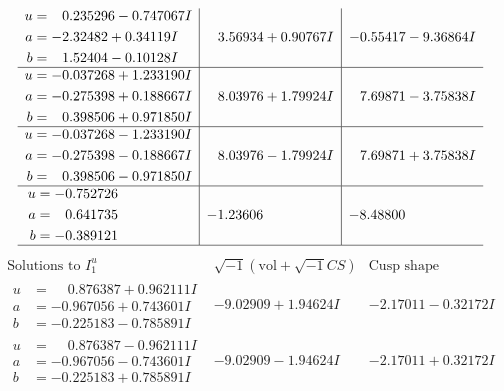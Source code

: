 \documentclass[1p]{elsarticle_modified}
\theoremstyle{definition}
\newcommand{\I}{\sqrt{-1}}
\begin{document}
$$\begin{array}{c|c|c}
\begin{aligned}
u &= \phantom{-}0.235296 - 0.747067 I \\
a &= -2.32482 + 0.34119 I \\
b &= \phantom{-}1.52404 - 0.10128 I\end{aligned}
 & \phantom{-}3.56934 + 0.90767 I & -0.55417 - 9.36864 I \\ \hline\begin{aligned}
u &= -0.037268 + 1.233190 I \\
a &= -0.275398 + 0.188667 I \\
b &= \phantom{-}0.398506 + 0.971850 I\end{aligned}
 & \phantom{-}8.03976 + 1.79924 I & \phantom{-}7.69871 - 3.75838 I \\ \hline\begin{aligned}
u &= -0.037268 - 1.233190 I \\
a &= -0.275398 - 0.188667 I \\
b &= \phantom{-}0.398506 - 0.971850 I\end{aligned}
 & \phantom{-}8.03976 - 1.79924 I & \phantom{-}7.69871 + 3.75838 I \\ \hline\begin{aligned}
u &= -0.752726\phantom{ +0.000000I} \\
a &= \phantom{-}0.641735\phantom{ +0.000000I} \\
b &= -0.389121\phantom{ +0.000000I}\end{aligned}
 & -1.23606\phantom{ +0.000000I} & -8.48800\phantom{ +0.000000I}\\
 \hline 
 \end{array}$$\newpage$$\begin{array}{c|c|c}  
\text{Solutions to }I^u_{1}& \I (\text{vol} + \sqrt{-1}CS) & \text{Cusp shape}\\
 \hline 
\begin{aligned}
u &= \phantom{-}0.876387 + 0.962111 I \\
a &= -0.967056 + 0.743601 I \\
b &= -0.225183 - 0.785891 I\end{aligned}
 & -9.02909 + 1.94624 I & -2.17011 - 0.32172 I \\ \hline\begin{aligned}
u &= \phantom{-}0.876387 - 0.962111 I \\
a &= -0.967056 - 0.743601 I \\
b &= -0.225183 + 0.785891 I\end{aligned}
 & -9.02909 - 1.94624 I & -2.17011 + 0.32172 I \\ \hline\begin{aligned}

\end{aligned}
\end{array}$$
\end{document}
